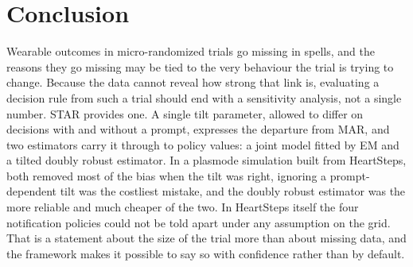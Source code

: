 \documentclass[12pt]{article}
\begin{document}
\section{Conclusion}

Wearable outcomes in micro-randomized trials go missing in spells, and the reasons they go missing may be tied to the very behaviour the trial is trying to change. Because the data cannot reveal how strong that link is, evaluating a decision rule from such a trial should end with a sensitivity analysis, not a single number. STAR provides one. A single tilt parameter, allowed to differ on decisions with and without a prompt, expresses the departure from MAR, and two estimators carry it through to policy values: a joint model fitted by EM and a tilted doubly robust estimator. In a plasmode simulation built from HeartSteps, both removed most of the bias when the tilt was right, ignoring a prompt-dependent tilt was the costliest mistake, and the doubly robust estimator was the more reliable and much cheaper of the two. In HeartSteps itself the four notification policies could not be told apart under any assumption on the grid. That is a statement about the size of the trial more than about missing data, and the framework makes it possible to say so with confidence rather than by default.
\end{document}
